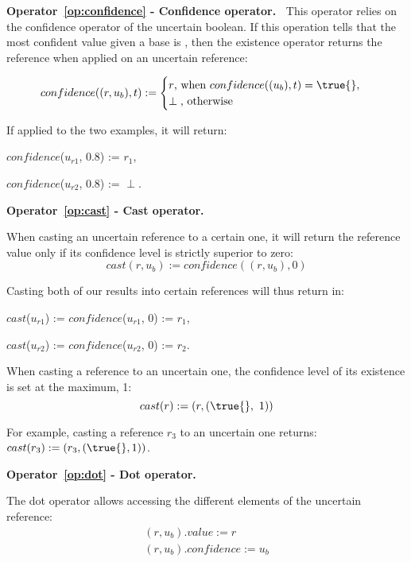 \noindent\textbf{Operator~\ref{op:confidence} - Confidence operator.~}
This operator relies on the confidence operator of the uncertain boolean.
If this operation tells that the most confident value given a base is \true{}, then the existence operator returns the reference when applied on an uncertain reference:
 
$$confidence((r,u_b), t) := \begin{cases}
                                                r \text{, when } confidence((u_b), t) = \true{}, \\
                                                \perp \text{, otherwise}
                                            \end{cases}$$
                                           
If applied to the two examples, it will return:
\begin{itemize*}
    \item[] $confidence$($u_{r1}$, 0.8) := $r_1$,
    \item[] $confidence$($u_{r2}$, 0.8) := $\perp$.
\end{itemize*}

\bigskip

\noindent\textbf{Operator~\ref{op:cast} - Cast operator.~}

When casting an uncertain reference to a certain one, it will return the reference value only if its  confidence level is strictly superior to zero:
$$cast(r, u_b) := confidence((r, u_b), 0)$$

Casting both of our results into certain references will thus return in:
\begin{itemize*}
    \item[] $cast$($u_{r1}$) := $confidence$($u_{r1}$, 0) := $r_1$,
    \item[] $cast$($u_{r2}$) := $confidence$($u_{r2}$, 0) := $r_2$.
\end{itemize*}

When casting a reference to an uncertain one, the confidence level of its existence is set at the maximum, 1:
$$cast(r) := (r, (\true{},~1))$$

For example, casting a reference $r_3$ to an uncertain one returns: $cast(r_3) := (r_3, (\true{}, 1))$.

\bigskip

\noindent\textbf{Operator~\ref{op:dot} - Dot operator.~}

The dot operator allows accessing the different elements of the uncertain reference: 
\begin{align*}
	(r, u_b).value := r\\
	(r, u_b).confidence := u_b
\end{align*}

